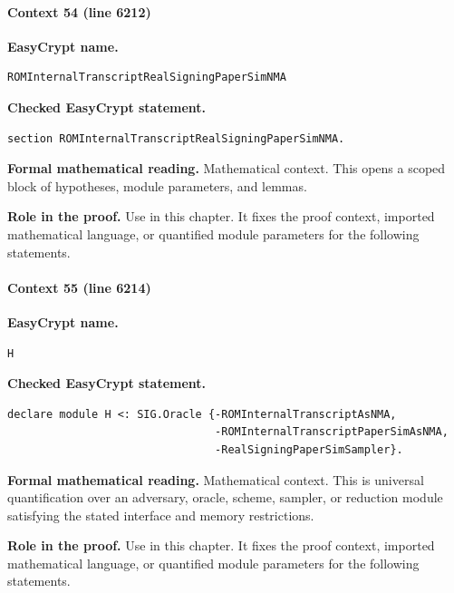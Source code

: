 \paragraph{Context 54 (line 6212)}
\noindent\textbf{EasyCrypt name.}
\begin{lstlisting}[language=EasyCrypt,basicstyle=\ttfamily\scriptsize]
ROMInternalTranscriptRealSigningPaperSimNMA
\end{lstlisting}
\noindent\textbf{Checked EasyCrypt statement.}
\begin{lstlisting}[language=EasyCrypt,basicstyle=\ttfamily\scriptsize]
section ROMInternalTranscriptRealSigningPaperSimNMA.
\end{lstlisting}
\noindent\textbf{Formal mathematical reading.}
Mathematical context. This opens a scoped block of hypotheses, module parameters, and lemmas.

\noindent\textbf{Role in the proof.}
Use in this chapter. It fixes the proof context, imported mathematical language, or quantified module parameters for the following statements.

\paragraph{Context 55 (line 6214)}
\noindent\textbf{EasyCrypt name.}
\begin{lstlisting}[language=EasyCrypt,basicstyle=\ttfamily\scriptsize]
H
\end{lstlisting}
\noindent\textbf{Checked EasyCrypt statement.}
\begin{lstlisting}[language=EasyCrypt,basicstyle=\ttfamily\scriptsize]
declare module H <: SIG.Oracle {-ROMInternalTranscriptAsNMA,
                                -ROMInternalTranscriptPaperSimAsNMA,
                                -RealSigningPaperSimSampler}.
\end{lstlisting}
\noindent\textbf{Formal mathematical reading.}
Mathematical context. This is universal quantification over an adversary, oracle, scheme, sampler, or reduction module satisfying the stated interface and memory restrictions.

\noindent\textbf{Role in the proof.}
Use in this chapter. It fixes the proof context, imported mathematical language, or quantified module parameters for the following statements.

